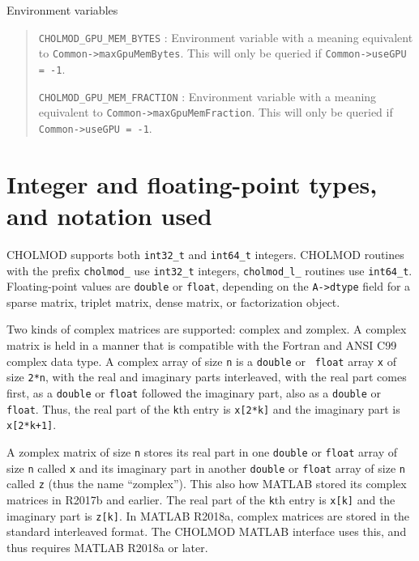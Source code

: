 \documentclass[11pt]{article}
\begin{document}
Environment variables

\begin{quote}
  {\tt CHOLMOD\_GPU\_MEM\_BYTES} : Environment variable with a meaning
  equivalent to \newline
  {\tt Common->maxGpuMemBytes}.  This will only be queried if
  {\tt Common->useGPU = -1}.

  {\tt CHOLMOD\_GPU\_MEM\_FRACTION} : Environment variable with a meaning
  equivalent to \newline
  {\tt Common->maxGpuMemFraction}.  This will only be queried if
  {\tt Common->useGPU = -1}.

\end{quote}

\newpage \section{Integer and floating-point types, and notation used}

CHOLMOD supports both {\tt int32\_t} and {\tt int64\_t} integers.  CHOLMOD
routines with the prefix {\tt cholmod\_} use {\tt int32\_t} integers,
{\tt cholmod\_l\_} routines use {\tt int64\_t}.  Floating-point
values are {\tt double} or {\tt float}, depending on the {\tt A->dtype}
field for a sparse matrix, triplet matrix, dense matrix, or factorization
object.

Two kinds of complex matrices are supported: complex and zomplex.  A complex
matrix is held in a manner that is compatible with the Fortran and ANSI C99
complex data type.  A complex array of size {\tt n} is a {\tt double} or {\tt
float} array {\tt x} of size {\tt 2*n}, with the real and imaginary parts
interleaved, with the real part comes first, as a {\tt double} or {\tt float}
followed the imaginary part, also as a {\tt double} or {\tt float}.  Thus, the
real part of the {\tt k}th entry is {\tt x[2*k]} and the imaginary part is {\tt
x[2*k+1]}.

A zomplex matrix of size {\tt n} stores its real part in one {\tt double} or
{\tt float} array of size {\tt n} called {\tt x} and its imaginary part in
another {\tt double} or {\tt float} array of size {\tt n} called {\tt z} (thus
the name ``zomplex'').  This also how MATLAB stored its complex matrices in
R2017b and earlier.  The real part of the {\tt k}th entry is {\tt x[k]} and the
imaginary part is {\tt z[k]}.  In MATLAB R2018a, complex matrices are stored
in the standard interleaved format.  The CHOLMOD MATLAB interface uses this,
and thus requires MATLAB R2018a or later.
\end{document}
